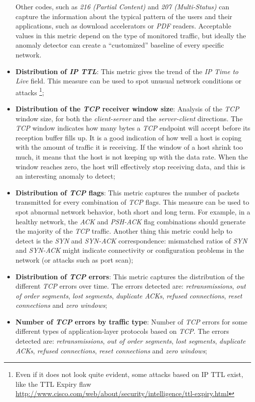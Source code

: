 \documentclass[12pt,a4paper,cucitura]{toptesi}
\begin{document}
\begin{itemize}
Other codes, such as \emph{216 (Partial Content)} and \emph{207 (Multi-Status)} can capture the information about the typical pattern of the users and their applications, such as download accelerators or \emph{PDF} readers. Acceptable values in this metric depend on the type of monitored traffic, but ideally the anomaly detector can create a ``customized'' baseline of every specific network.
\item \textbf{Distribution of \emph{IP TTL}}: This metric gives the trend of the \emph{IP Time to Live} field. This measure can be used to spot unusual network conditions or attacks \footnote{Even if it does not look quite evident, some attacks based on IP TTL exist, like the TTL Expiry flaw \url{http://www.cisco.com/web/about/security/intelligence/ttl-expiry.html}};
\item \textbf{Distribution of the \emph{TCP} receiver window size}: Analysis of the \emph{TCP} window size, for both the \emph{client-server} and the \emph{server-client} directions. The \emph{TCP} window indicates how many bytes a \emph{TCP} endpoint will accept before its reception buffer fills up. It is a good indication of how well a host is coping with the amount of traffic it is receiving. If the window of a host shrink too much, it means that the host is not keeping up with the data rate. When the window reaches zero, the host will effectively stop receiving data, and this is an interesting anomaly to detect;
\item \textbf{Distribution of \emph{TCP} flags}: This metric captures the number of packets transmitted for every combination of \emph{TCP} flags. This measure can be used to spot abnormal network behavior, both short and long term. For example, in a healthy network, the \emph{ACK} and \emph{PSH-ACK} flag combinations should  generate the majority of the \emph{TCP} traffic. Another thing this metric could help to detect is the \emph{SYN} and \emph{SYN-ACK} correspondence: mismatched ratios of \emph{SYN} and \emph{SYN-ACK} might indicate connectivity or configuration problems in the network (or attacks such as port scan);
\item \textbf{Distribution of \emph{TCP} errors}: This metric captures the distribution of the different \emph{TCP} errors over time.
The errors detected are: \emph{retransmissions}, \emph{out of order segments}, \emph{lost segments}, \emph{duplicate ACKs}, \emph{refused connections}, \emph{reset connections} and \emph{zero windows};
\item \textbf{Number of \emph{TCP} errors by traffic type}: Number of \emph{TCP} errors for some different types of application-layer protocols based on \emph{TCP}. The errors detected are: \emph{retransmissions}, \emph{out of order segments}, \emph{lost segments}, \emph{duplicate ACKs}, \emph{refused connections}, \emph{reset connections} and \emph{zero windows};

\end{itemize}
\end{document}
